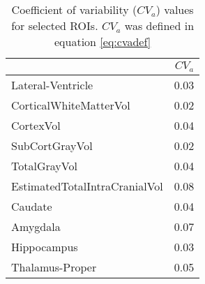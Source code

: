 \begin{table}
[]
\centering
\begin{tabular}{lr}
\toprule
{} &   $CV_{a}$ \\
\midrule
Lateral-Ventricle             &  0.03 \\
CorticalWhiteMatterVol        &  0.02 \\
CortexVol                     &  0.04 \\
SubCortGrayVol                &  0.02 \\
TotalGrayVol                  &  0.04 \\
EstimatedTotalIntraCranialVol &  0.08 \\
Caudate                       &  0.04 \\
Amygdala                      &  0.07 \\
Hippocampus                   &  0.03 \\
Thalamus-Proper               &  0.05 \\
\bottomrule
\end{tabular}
\caption{Coefficient of variability ($CV_{a}$) values for selected ROIs. $CV_{a}$ was defined in equation \ref{eq:cvadef}}
\label{tab:cva} 
\end{table}